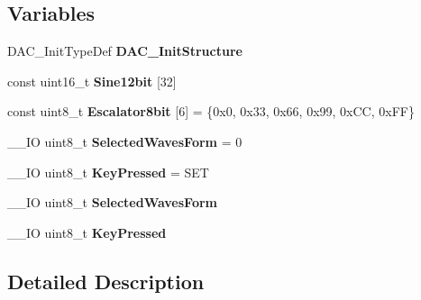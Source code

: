 \subsection*{Variables}
\begin{DoxyCompactItemize}
\item 
\hypertarget{group___d_a_c___signals_generation_ga9f54bfd3711229dd98a67fd037b07be1}{D\-A\-C\-\_\-\-Init\-Type\-Def {\bfseries D\-A\-C\-\_\-\-Init\-Structure}}\label{group___d_a_c___signals_generation_ga9f54bfd3711229dd98a67fd037b07be1}

\item 
const uint16\-\_\-t {\bfseries Sine12bit} \mbox{[}32\mbox{]}
\item 
\hypertarget{group___d_a_c___signals_generation_ga588f3c9b10d203056c55e23e7c6d7ea4}{const uint8\-\_\-t {\bfseries Escalator8bit} \mbox{[}6\mbox{]} = \{0x0, 0x33, 0x66, 0x99, 0x\-C\-C, 0x\-F\-F\}}\label{group___d_a_c___signals_generation_ga588f3c9b10d203056c55e23e7c6d7ea4}

\item 
\hypertarget{group___d_a_c___signals_generation_ga724cd7e4dabb8da7bfe90e07e09af295}{\-\_\-\-\_\-\-I\-O uint8\-\_\-t {\bfseries Selected\-Waves\-Form} = 0}\label{group___d_a_c___signals_generation_ga724cd7e4dabb8da7bfe90e07e09af295}

\item 
\hypertarget{group___d_a_c___signals_generation_gad944adf538c6df6d87049ed55dda302b}{\-\_\-\-\_\-\-I\-O uint8\-\_\-t {\bfseries Key\-Pressed} = S\-E\-T}\label{group___d_a_c___signals_generation_gad944adf538c6df6d87049ed55dda302b}

\item 
\hypertarget{group___d_a_c___signals_generation_ga724cd7e4dabb8da7bfe90e07e09af295}{\-\_\-\-\_\-\-I\-O uint8\-\_\-t {\bfseries Selected\-Waves\-Form}}\label{group___d_a_c___signals_generation_ga724cd7e4dabb8da7bfe90e07e09af295}

\item 
\hypertarget{group___d_a_c___signals_generation_gad944adf538c6df6d87049ed55dda302b}{\-\_\-\-\_\-\-I\-O uint8\-\_\-t {\bfseries Key\-Pressed}}\label{group___d_a_c___signals_generation_gad944adf538c6df6d87049ed55dda302b}

\end{DoxyCompactItemize}


\subsection{Detailed Description}


